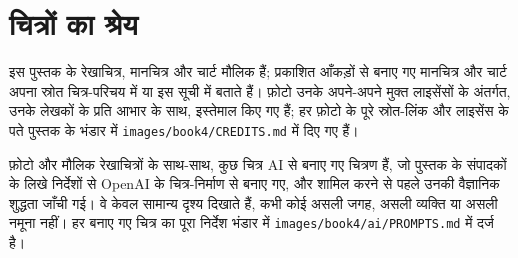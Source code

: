 \chapter*{चित्रों का श्रेय}

इस पुस्तक के रेखाचित्र, मानचित्र और चार्ट मौलिक हैं; प्रकाशित आँकड़ों से बनाए गए मानचित्र और
चार्ट अपना स्रोत चित्र-परिचय में या इस सूची में बताते हैं। फ़ोटो उनके अपने-अपने मुक्त लाइसेंसों के
अंतर्गत, उनके लेखकों के प्रति आभार के साथ, इस्तेमाल किए गए हैं; हर फ़ोटो के पूरे स्रोत-लिंक और
लाइसेंस के पते पुस्तक के भंडार में \texttt{images/book4/CREDITS.md} में दिए गए हैं।

\bigskip
फ़ोटो और मौलिक रेखाचित्रों के साथ-साथ, कुछ चित्र AI से बनाए गए चित्रण हैं, जो पुस्तक के
संपादकों के लिखे निर्देशों से OpenAI के चित्र-निर्माण से बनाए गए, और शामिल करने से पहले उनकी
वैज्ञानिक शुद्धता जाँची गई। वे केवल सामान्य दृश्य दिखाते हैं, कभी कोई असली जगह, असली व्यक्ति
या असली नमूना नहीं। हर बनाए गए चित्र का पूरा निर्देश भंडार में
\texttt{images/book4/ai/PROMPTS.md} में दर्ज है।

